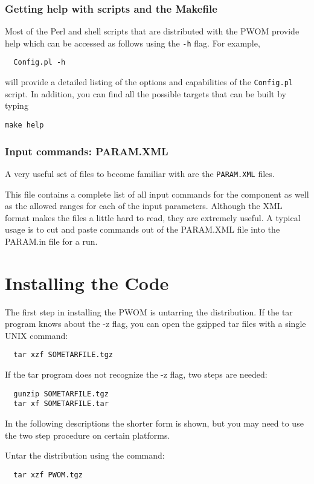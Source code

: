 \subsubsection{Getting help with scripts and the Makefile}

Most of the Perl and shell scripts that are distributed with the PWOM
provide help which can be accessed as follows using the {\tt -h} flag.
For example, 
\begin{verbatim}
  Config.pl -h
\end{verbatim}
will provide a detailed listing of the options and capabilities of the
{\tt Config.pl} script.  In addition, you can find all the possible
targets  that can be built by typing
\begin{verbatim}
make help
\end{verbatim}

\subsubsection{Input commands: PARAM.XML}
A very useful set of files to become familiar with are the {\tt PARAM.XML}
files.

This file contains a complete list of all input commands for the
component as well as the allowed ranges for each of the input parameters.
Although the XML format makes the files a little hard to read, they are
extremely useful.  A typical usage is to cut and paste commands out of the
PARAM.XML file into the PARAM.in file for a run.


\section{Installing the Code}

The first step in installing the PWOM is untarring the distribution.
If the tar program knows about the -z flag, you can open the gzipped
tar files with a single UNIX command:
\begin{verbatim}
  tar xzf SOMETARFILE.tgz
\end{verbatim}
If the tar program does not recognize the -z flag, two steps are needed:
\begin{verbatim}
  gunzip SOMETARFILE.tgz
  tar xf SOMETARFILE.tar
\end{verbatim}
In the following descriptions the shorter form is shown, but you may
need to use the two step procedure on certain platforms.

Untar the distribution using the command:
\begin{verbatim}
  tar xzf PWOM.tgz
\end{verbatim}

